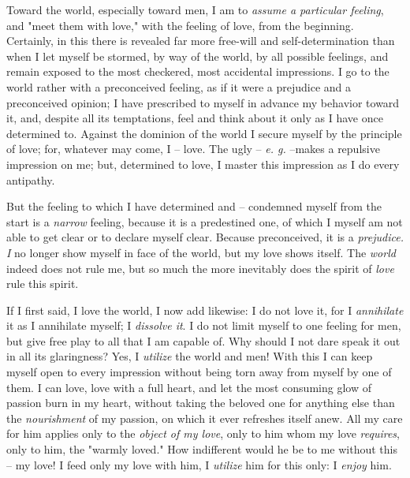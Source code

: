 Toward the world, especially toward men, I am to \textit{assume a particular 
feeling}, and "{}meet them with love,"{} with the feeling of love, from the 
beginning. Certainly, in this there is revealed far more free-will and 
self-determination than when I let myself be stormed, by way of the world, by 
all possible feelings, and remain exposed to the most checkered, most 
accidental impressions. I go to the world rather with a preconceived feeling, 
as if it were a prejudice and a preconceived opinion; I have prescribed to 
myself in advance my behavior toward it, and, despite all its temptations, 
feel and think about it only as I have once determined to. Against the 
dominion of the world I secure myself by the principle of love; for, whatever 
may come, I -- love. The ugly -- \textit{e. g.} --makes a repulsive impression 
on me; but, determined to love, I master this impression as I do every 
antipathy.

But the feeling to which I have determined and -- condemned myself from the 
start is a \textit{narrow} feeling, because it is a predestined one, of which 
I myself am not able to get clear or to declare myself clear. Because 
preconceived, it is a \textit{prejudice. I} no longer show myself in face of 
the world, but my love shows itself. The \textit{world} indeed does not rule 
me, but so much the more inevitably does the spirit of \textit{love} rule this 
spirit.

If I first said, I love the world, I now add likewise: I do not love it, for I 
\textit{annihilate} it as I annihilate myself; I \textit{dissolve it}. I do 
not limit myself to one feeling for men, but give free play to all that I am 
capable of. Why should I not dare speak it out in all its glaringness? Yes, I 
\textit{utilize} the world and men! With this I can keep myself open to every 
impression without being torn away from myself by one of them. I can love, 
love with a full heart, and let the most consuming glow of passion burn in my 
heart, without taking the beloved one for anything else than the 
\textit{nourishment} of my passion, on which it ever refreshes itself anew. 
All my care for him applies only to the \textit{object of my love}, only to 
him whom my love \textit{requires}, only to him, the "{}warmly loved."{} How 
indifferent would he be to me without this -- my love! I feed only my love 
with him, I \textit{utilize} him for this only: I \textit{enjoy} him.

